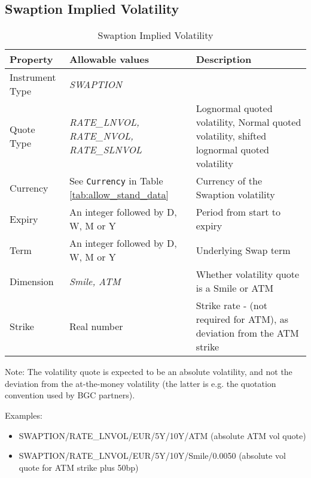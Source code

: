 \subsection{Swaption Implied Volatility}

\begin{table}[H]
\centering
  \begin{tabular}{|p{3cm}|p{3.5cm}|p{7cm}|}
    \hline
    {\bf Property} & {\bf Allowable values} & {\bf Description} \\ \hline
    Instrument Type & \emph{SWAPTION} & \\ \hline
    Quote Type & \emph{RATE\_LNVOL, RATE\_NVOL, RATE\_SLNVOL} & Lognormal quoted volatility, Normal quoted volatility, shifted lognormal quoted volatility\\ \hline
    Currency & See \lstinline!Currency! in Table \ref{tab:allow_stand_data}&  Currency of the Swaption volatility\\ \hline
    Expiry & An integer followed by D, W, M or Y & Period from start to expiry \\ \hline
    Term & An integer followed by D, W, M or Y & Underlying Swap term \\ \hline
    Dimension & \emph{Smile, ATM}  & Whether volatility quote is a Smile or ATM \\ \hline
    Strike & Real number & Strike rate - (not required for ATM), as deviation from the ATM strike\\ \hline
  \end{tabular}
  \caption{Swaption Implied Volatility}
  \label{tab:swaptimplvol_quote}
\end{table}


\medskip Note: The volatility quote is expected to be an absolute volatility, and not the deviation from the
at-the-money volatility (the latter is e.g. the quotation convention used by BGC partners).

\medskip
Examples:
\begin{itemize}
\item { SWAPTION/RATE\_LNVOL/EUR/5Y/10Y/ATM} (absolute ATM vol quote)
\item { SWAPTION/RATE\_LNVOL/EUR/5Y/10Y/Smile/0.0050} (absolute vol quote for ATM strike plus 50bp)
\end{itemize}

